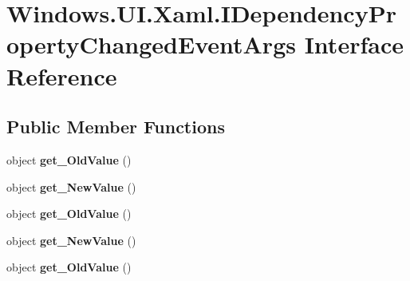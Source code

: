 \hypertarget{interface_windows_1_1_u_i_1_1_xaml_1_1_i_dependency_property_changed_event_args}{}\section{Windows.\+U\+I.\+Xaml.\+I\+Dependency\+Property\+Changed\+Event\+Args Interface Reference}
\label{interface_windows_1_1_u_i_1_1_xaml_1_1_i_dependency_property_changed_event_args}
\subsection*{Public Member Functions}
\begin{DoxyCompactItemize}
\item 
\mbox{\label{interface_windows_1_1_u_i_1_1_xaml_1_1_i_dependency_property_changed_event_args_a8140c2b70727e626b0bd04fa5ddf12d7}} 
object {\bfseries get\+\_\+\+Old\+Value} ()
\item 
\mbox{\label{interface_windows_1_1_u_i_1_1_xaml_1_1_i_dependency_property_changed_event_args_a44a0890418189c0d52d6eb9b9a86d355}} 
object {\bfseries get\+\_\+\+New\+Value} ()
\item 
\mbox{\label{interface_windows_1_1_u_i_1_1_xaml_1_1_i_dependency_property_changed_event_args_a8140c2b70727e626b0bd04fa5ddf12d7}} 
object {\bfseries get\+\_\+\+Old\+Value} ()
\item 
\mbox{\label{interface_windows_1_1_u_i_1_1_xaml_1_1_i_dependency_property_changed_event_args_a44a0890418189c0d52d6eb9b9a86d355}} 
object {\bfseries get\+\_\+\+New\+Value} ()
\item 
\mbox{\label{interface_windows_1_1_u_i_1_1_xaml_1_1_i_dependency_property_changed_event_args_a8140c2b70727e626b0bd04fa5ddf12d7}} 
object {\bfseries get\+\_\+\+Old\+Value} ()
\item 

\end{DoxyCompactItemize}
